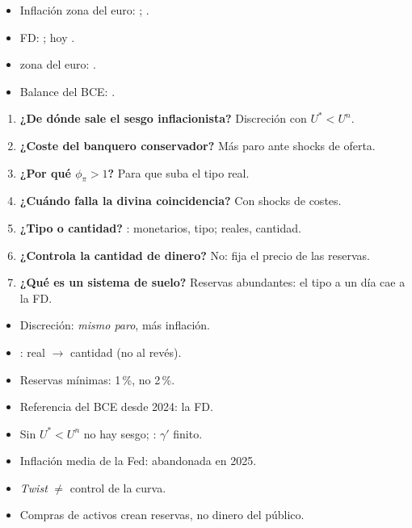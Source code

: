 \documentclass{article}
\begin{document}
\begin{columnas}
\anexorepaso
{}
\begin{itemize}
\item Inflación zona del euro: ; .
\item FD: ; hoy .
\item {} zona del euro: .
\item Balance del BCE: .
\end{itemize}
\begin{enumerate}
\item \textbf{¿De dónde sale el sesgo inflacionista?} Discreción con $U^*<U^n$.
\item \textbf{¿Coste del banquero conservador?} Más paro ante shocks de oferta.
\item \textbf{¿Por qué $\phi_\pi>1$?} Para que suba el tipo real.
\item \textbf{¿Cuándo falla la divina coincidencia?} Con shocks de costes.
\item \textbf{¿Tipo o cantidad?} : monetarios, tipo; reales, cantidad.
\item \textbf{¿Controla la cantidad de dinero?} No: fija el precio de las reservas.
\item \textbf{¿Qué es un sistema de suelo?} Reservas abundantes: el tipo a un día cae a la FD.
\end{enumerate}
\begin{trampa}
\begin{itemize}
\item Discreción: \emph{mismo paro}, más inflación.
\item {}: real $\to$ cantidad (no al revés).
\item Reservas mínimas: 1\,\%, no 2\,\%.
\item Referencia del BCE desde 2024: la FD.
\item Sin $U^*<U^n$ no hay sesgo; : $\gamma'$ finito.
\item Inflación media de la Fed: abandonada en 2025.
\item \emph{Twist} $\neq$ control de la curva.
\item Compras de activos crean reservas, no dinero del público.
\end{itemize}
\end{trampa}

\end{columnas}
\end{document}
